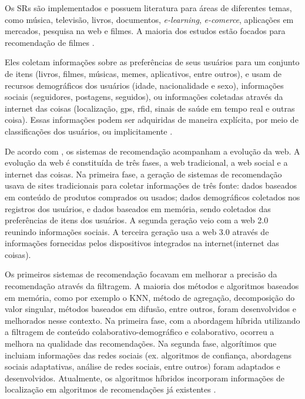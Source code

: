 Os SRs são implementados e possuem literatura 
para áreas de diferentes temas, como música, televisão, livros, 
documentos, \emph{e-learning}, \emph{e-comerce}, aplicações em mercados, 
pesquisa na web e filmes. A maioria dos estudos estão focados 
para recomendação de filmes \cite{bobadilla2013}.
 
Eles coletam informações sobre as preferências 
de seus usuários para um conjunto de itens (livros, filmes, músicas, 
memes, aplicativos, entre outros), e usam de recursos demográficos dos 
usuários (idade, nacionalidade e sexo), informações sociais 
(seguidores, postagens, seguidos), ou informações coletadas através da 
internet das coisas (localização, gps, rfid, sinais de saúde em tempo 
real e outras coisa). Essas informações podem ser adquiridas de maneira 
explícita, por meio de classificações dos usuários, ou implicitamente 
\cite{bobadilla2013}.

De acordo com , os sistemas de recomendação 
acompanham a evolução da web. A evolução da web é constituída de três 
fases, a web tradicional, a web social e a internet das coisas. 
Na primeira fase, a geração de sistemas de recomendação usava de 
sites tradicionais para coletar informações de três fonte: dados 
baseados em conteúdo de produtos comprados ou usados; dados 
demográficos coletados nos registros dos usuários, e dados baseados em 
memória, sendo coletados das preferências de itens dos usuários. A segunda 
geração veio com a web 2.0 reunindo informações sociais. A terceira 
geração usa a web 3.0 através de informações fornecidas pelos dispositivos 
integrados na internet(internet das coisas).

Os primeiros sistemas de recomendação focavam em melhorar a precisão da 
recomendação através da filtragem. A maioria dos métodos e algoritmos 
baseados em memória, como por exemplo o KNN, método de agregação, decomposição do valor 
singular, métodos baseados em difusão, entre outros, foram
desenvolvidos e melhorados nesse contexto. Na primeira fase, com a 
abordagem híbrida utilizando a filtragem de conteúdo 
colaborativo-demográfico e colaborativo, ocorreu a melhora na qualidade 
das recomendações. Na segunda fase, algorítimos que incluiam informações 
das redes sociais (ex. algoritmos de
confiança, abordagens sociais adaptativas, análise de redes sociais, 
entre outros) foram adaptados e 
desenvolvidos. Atualmente, os algoritmos híbridos incorporam informações 
de localização em algoritmos de recomendações já existentes \cite{bobadilla2013}. 

